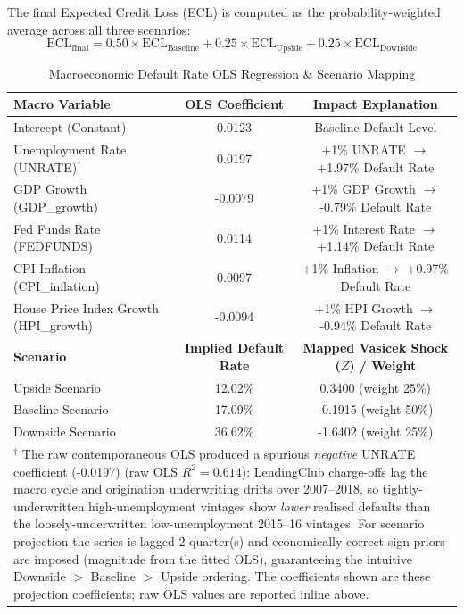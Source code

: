 \documentclass[11pt,a4paper]{article}
\begin{document}
The final Expected Credit Loss (ECL) is computed as the probability-weighted average across all three scenarios:
\begin{equation}
\text{ECL}_{\text{final}} = 0.50 \times \text{ECL}_{\text{Baseline}} + 0.25 \times \text{ECL}_{\text{Upside}} + 0.25 \times \text{ECL}_{\text{Downside}}
\end{equation}

\begin{table}[H]
\centering
\small
\caption{Macroeconomic Default Rate OLS Regression \& Scenario Mapping}
\label{tab:macro_regression}
\vspace{0.5em}
\begin{tabular}{lcc}
\toprule
\textbf{Macro Variable} & \textbf{OLS Coefficient} & \textbf{Impact Explanation} \\
\midrule
Intercept (Constant) & 0.0123 & Baseline Default Level \\
Unemployment Rate (UNRATE)$^{\dagger}$ & 0.0197 & +1\% UNRATE $\rightarrow$ +1.97\% Default Rate \\
GDP Growth (GDP\_growth) & -0.0079 & +1\% GDP Growth $\rightarrow$ -0.79\% Default Rate \\
Fed Funds Rate (FEDFUNDS) & 0.0114 & +1\% Interest Rate $\rightarrow$ +1.14\% Default Rate \\
CPI Inflation (CPI\_inflation) & 0.0097 & +1\% Inflation $\rightarrow$ +0.97\% Default Rate \\
House Price Index Growth (HPI\_growth) & -0.0094 & +1\% HPI Growth $\rightarrow$ -0.94\% Default Rate \\
\midrule
\textbf{Scenario} & \textbf{Implied Default Rate} & \textbf{Mapped Vasicek Shock ($Z$) / Weight} \\
\midrule
Upside Scenario & 12.02\% & 0.3400 (weight 25\%) \\
Baseline Scenario & 17.09\% & -0.1915 (weight 50\%) \\
Downside Scenario & 36.62\% & -1.6402 (weight 25\%) \\
\bottomrule
\multicolumn{3}{p{\linewidth}}{\footnotesize$^{\dagger}$ The raw contemporaneous OLS produced a spurious \emph{negative} UNRATE coefficient (-0.0197) (raw OLS $R^2=0.614$): LendingClub charge-offs lag the macro cycle and origination underwriting drifts over 2007--2018, so tightly-underwritten high-unemployment vintages show \emph{lower} realised defaults than the loosely-underwritten low-unemployment 2015--16 vintages. For scenario projection the series is lagged 2 quarter(s) and economically-correct sign priors are imposed (magnitude from the fitted OLS), guaranteeing the intuitive Downside $>$ Baseline $>$ Upside ordering. The coefficients shown are these projection coefficients; raw OLS values are reported inline above.} \\
\end{tabular}
\end{table}
\end{document}
